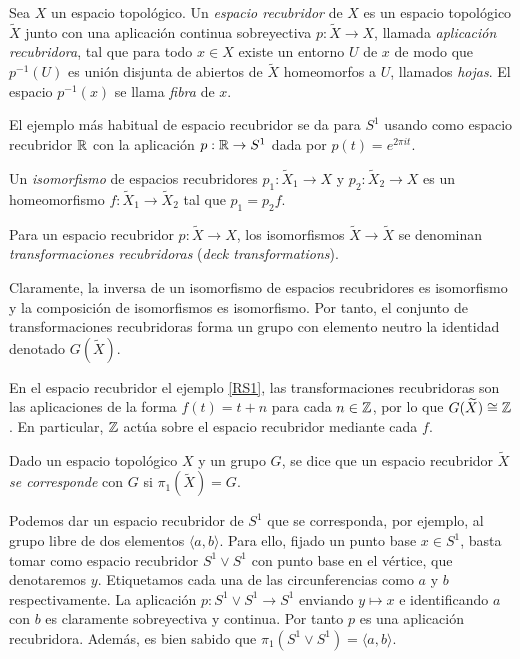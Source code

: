 \documentclass[TFG.tex]{subfiles}
\begin{document}
\begin{defi}
Sea $X$ un espacio topológico. Un \emph{espacio recubridor} de $X$ es un espacio topológico $\widetilde{X}$ junto con una aplicación continua sobreyectiva $p:\widetilde{X}\to X$, llamada \emph{aplicación recubridora}, tal que para todo $x\in X$ existe un entorno $U$ de $x$ de modo que $p^{-1}(U)$ es unión disjunta de abiertos de $\widetilde{X}$ homeomorfos a $U$, llamados \emph{hojas}. El espacio $p^{-1}(x)$ se llama \emph{fibra} de $x$.
\end{defi}

\begin{ej}\label{RS1}
El ejemplo más habitual de espacio recubridor se da para $S^1$ usando como espacio recubridor $\mathbb{R}$ con la aplicación $p:\mathbb{R}\to S^1$ dada por $p(t)=e^{2\pi i t}$. 
\end{ej}

\begin{defi}
Un \emph{isomorfismo} de espacios recubridores $p_1:\widetilde{X}_1\to X$ y $p_2:\widetilde{X}_2\to X$ es un homeomorfismo $f:\widetilde{X}_1\to\widetilde{X}_2$ tal que $p_1=p_2f$.
\end{defi}

\begin{defi}
Para un espacio recubridor $p:\widetilde{X}\to X$, los isomorfismos $\widetilde{X}\to\widetilde{X}$ se denominan \emph{transformaciones recubridoras} (\emph{deck transformations}). 
\end{defi}

Claramente, la inversa de un isomorfismo de espacios recubridores es isomorfismo y la composición de isomorfismos es isomorfismo. Por tanto, el conjunto de transformaciones recubridoras forma un grupo con elemento neutro la identidad denotado $G(\widetilde{X})$. 

\begin{ej}
En el espacio recubridor el ejemplo \ref{RS1}, las transformaciones recubridoras son las aplicaciones de la forma $f(t)=t+n$ para cada $n\in\mathbb{Z}$, por lo que $G(\widetilde{X})\cong\mathbb{Z}$. En particular, $\mathbb{Z}$ actúa sobre el espacio recubridor mediante cada $f$. 
\end{ej}

\begin{defi}\label{corresponde}
Dado un espacio topológico $X$ y un grupo $G$, se dice que un espacio recubridor $\widetilde{X}$ \emph{se corresponde} con $G$ si $\pi_1(\widetilde{X})=G$. 
\end{defi}

\begin{ej}
Podemos dar un espacio recubridor de $S^1$ que se corresponda, por ejemplo, al grupo libre de dos elementos $\langle a, b\rangle$. Para ello, fijado un punto base $x\in S^1$, basta tomar como espacio recubridor $S^1\lor S^1$ con punto base en el vértice, que denotaremos $y$. Etiquetamos cada una de las circunferencias como $a$ y $b$ respectivamente. La aplicación $p:S^1\lor S^1\to S^1$ enviando $y\mapsto x$ e identificando $a$ con $b$ es claramente sobreyectiva y continua. Por tanto $p$ es una aplicación recubridora. Además, es bien sabido que $\pi_1(S^1\lor  S^1)=\langle a, b\rangle$. 
\end{ej}
\end{document}
